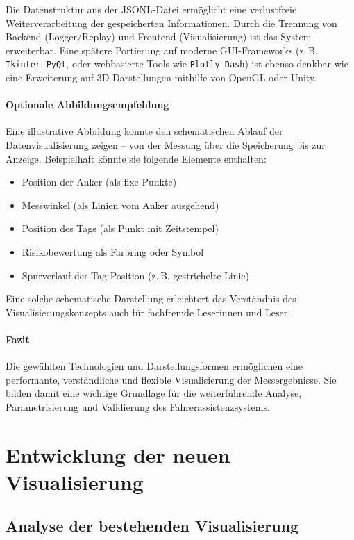 \documentclass[a4paper, 12pt]{article} %
\begin{document}
Die Datenstruktur aus der JSONL-Datei ermöglicht eine verlustfreie Weiterverarbeitung der gespeicherten Informationen. Durch die Trennung von 
Backend (Logger/Replay) und Frontend (Visualisierung) ist das System erweiterbar. Eine spätere Portierung auf moderne GUI-Frameworks 
(z.\,B. \texttt{Tkinter}, \texttt{PyQt}, oder webbasierte Tools wie \texttt{Plotly Dash}) ist ebenso denkbar wie eine Erweiterung auf 3D-Darstellungen 
mithilfe von OpenGL oder Unity.

\paragraph{Optionale Abbildungsempfehlung}

Eine illustrative Abbildung könnte den schematischen Ablauf der Datenvisualisierung zeigen – von der Messung über die Speicherung bis zur Anzeige. 
Beispielhaft könnte sie folgende Elemente enthalten:

\begin{itemize}
    \item Position der Anker (als fixe Punkte)
    \item Messwinkel (als Linien vom Anker ausgehend)
    \item Position des Tags (als Punkt mit Zeitstempel)
    \item Risikobewertung als Farbring oder Symbol
    \item Spurverlauf der Tag-Position (z.\,B. gestrichelte Linie)
\end{itemize}

Eine solche schematische Darstellung erleichtert das Verständnis des Visualisierungskonzepts auch für fachfremde Leserinnen und Leser.

\paragraph{Fazit}

Die gewählten Technologien und Darstellungsformen ermöglichen eine performante, verständliche und flexible Visualisierung der Messergebnisse. Sie 
bilden damit eine wichtige Grundlage für die weiterführende Analyse, Parametrisierung und Validierung des Fahrerassistenzsystems.

\clearpage

\section{Entwicklung der neuen Visualisierung}
\subsection{Analyse der bestehenden Visualisierung}
\end{document}
